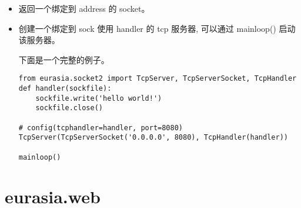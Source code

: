 \documentclass{manual}
\begin{document}
\begin{itemize}
\item {}

返回一个绑定到  address 的 socket。

\item {}

创建一个绑定到 sock 使用 handler 的 tcp 服务器, 可以通过 mainloop() 启动该服务器。

下面是一个完整的例子。

\begin{verbatim}
from eurasia.socket2 import TcpServer, TcpServerSocket, TcpHandler
def handler(sockfile):
	sockfile.write('hello world!')
	sockfile.close()

# config(tcphandler=handler, port=8080)
TcpServer(TcpServerSocket('0.0.0.0', 8080), TcpHandler(handler))

mainloop()
\end{verbatim}

\end{itemize}

\section{eurasia.web}
\end{document}
